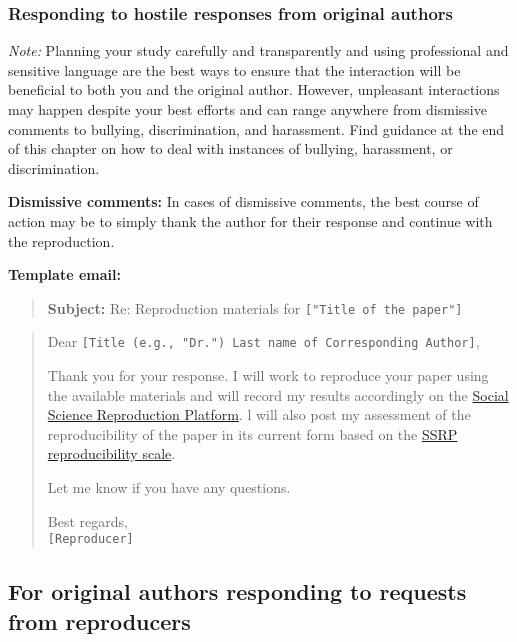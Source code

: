 \subsubsection{Responding to hostile responses from original
authors}

\textit{Note:} Planning your study carefully and transparently and using
professional and sensitive language are the best ways to ensure that the
interaction will be beneficial to both you and the original author.
However, unpleasant interactions may happen despite your best efforts
and can range anywhere from dismissive comments to bullying,
discrimination, and harassment. Find guidance at the end of this chapter
on how to deal with instances of bullying, harassment, or
discrimination.

\textbf{Dismissive comments:} In cases of dismissive comments, the best course of action may be to simply thank the author for their response and continue with the reproduction.

\textbf{Template email:}

\begin{quote}
\textbf{Subject:} Re: Reproduction materials for
\texttt{{[}"Title\ of\ the\ paper"{]}}
\end{quote}

\begin{quote}
Dear
\texttt{{[}Title\ (e.g.,\ "Dr.")\ Last\ name\ of\ Corresponding\ Author{]}},

Thank you for your response. I will work to reproduce your paper using
the available materials and will record my results accordingly on the
\href{https://www.socialsciencereproduction.org/}{Social Science
Reproduction Platform}. l will also post my assessment of the
reproducibility of the paper in its current form based on the
\href{https://bitss.github.io/ACRE/assessment.html\#levels-of-computational-reproducibility-for-a-specific-output}{SSRP
reproducibility scale}.

Let me know if you have any questions.

Best regards,\\
\texttt{{[}Reproducer{]}}
\end{quote}

\subsection{For original authors responding to requests from reproducers}

